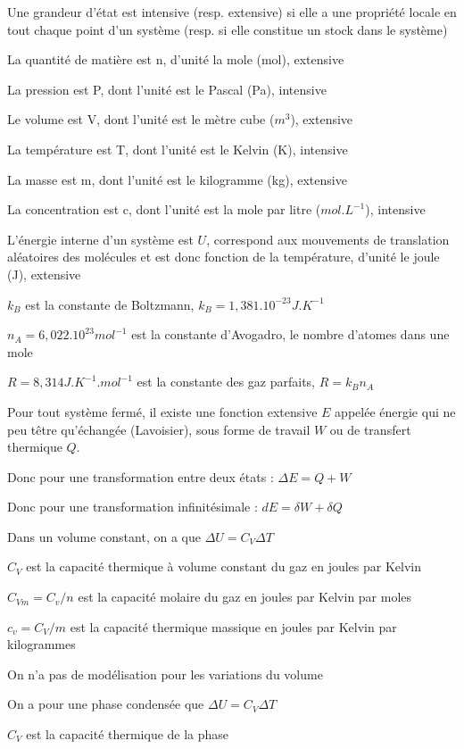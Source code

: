 \documentclass[a4paper,12pt]{book}
\newcommand{\Def}[2]{\begin{tcolorbox}[colback=white,colframe=red!10!green!20!blue!75!, title=Définition : #1]#2\end{tcolorbox}}
\newcommand{\Thr}[2]{\begin{tcolorbox}[sharp corners, colback=white,colframe=red!10!blue!30!green!75!, title=Théorème : #1]#2\end{tcolorbox}}
\begin{document}
\Def{Grandeurs}{Une grandeur d'état est intensive (resp. extensive) si elle a une propriété locale en tout chaque point d'un système (resp. si elle constitue un stock dans le système)
\par La quantité de matière est n, d'unité la mole (mol), extensive
\par La pression est P, dont l'unité est le Pascal (Pa), intensive
\par Le volume est V, dont l'unité est le mètre cube ($m^3$), extensive
\par La température est T, dont l'unité est le Kelvin (K), intensive
\par La masse est m, dont l'unité est le kilogramme (kg), extensive
\par La concentration est c, dont l'unité est la mole par litre ($mol.L^{-1}$), intensive
\par L'énergie interne d'un système est $U$, correspond aux mouvements de translation aléatoires des molécules et est donc fonction de la température, d'unité le joule (J), extensive}
\Def{Constantes}{$k_B$ est la constante de Boltzmann, $k_B=1,381.10^{-23} J.K^{-1}$
\par $n_A = 6,022.10^23 mol^{-1}$ est la constante d'Avogadro, le nombre d'atomes dans une mole
\par $R = 8,314J.K^{-1}.mol^{-1}$ est la constante des gaz parfaits, $R=k_Bn_A$}
\Thr{Premier Principe}{Pour tout système fermé, il existe une fonction extensive $E$ appelée énergie qui ne peu têtre qu'échangée (Lavoisier), sous forme de travail $W$ ou de transfert thermique $Q$.
\par Donc pour une transformation entre deux états : $\Delta E = Q + W$
\par Donc pour une transformation infinitésimale : $dE =\delta W+\delta Q$}
\Thr{Capacité thermique du gaz parfait}{Dans un volume constant, on a que $\Delta U = C_V\Delta T$
\par $C_V$ est la capacité thermique à volume constant du gaz en joules par Kelvin
\par $C_{Vm} = C_v/n$ est la capacité molaire du gaz en joules par Kelvin par moles
\par $c_v = C_V/m$ est la capacité thermique massique en joules par Kelvin par kilogrammes
\par On n'a pas de modélisation pour les variations du volume}
\Thr{Capacité thermique de la phase condensée}{On a pour une phase condensée que $\Delta U = C_V\Delta T$
\par $C_V$ est la capacité thermique de la phase}
\end{document}

